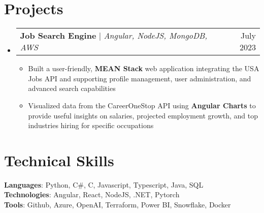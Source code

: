 \documentclass[letterpaper,11pt]{article}
\makeatletter
\newcommand{\resumeItem}[1]{
  \item\small{
    {#1 \vspace{-2pt}}
  }
}
\newcommand{\resumeSubSubheading}[2]{
    \item
    \begin{tabular*}{0.97\textwidth}{l@{\extracolsep{\fill}}r}
      \textit{\small#1} & \textit{\small #2} \\
    \end{tabular*}\vspace{-7pt}
}
\newcommand{\resumeProjectHeading}[2]{
    \item
    \begin{tabular*}{0.97\textwidth}{l@{\extracolsep{\fill}}r}
      \small#1 & #2 \\
    \end{tabular*}\vspace{-7pt}
}
\newcommand{\resumeSubHeadingListStart}{\begin{itemize}[leftmargin=0.15in, label={}]}
\newcommand{\resumeSubHeadingListEnd}{\end{itemize}}
\newcommand{\resumeItemListStart}{\begin{itemize}}
\newcommand{\resumeItemListEnd}{\end{itemize}\vspace{-5pt}}
\makeatother
\begin{document}

\section{Projects}
    \resumeSubHeadingListStart         
    
    \resumeProjectHeading
      {\textbf{Job Search Engine} $|$ \emph{Angular, NodeJS, MongoDB, AWS}}{July 2023}
      \resumeItemListStart
        \resumeItem{Built a user-friendly, \textbf{MEAN Stack} web application integrating the USA Jobs API and supporting profile management, user administration, and advanced search capabilities}
        \resumeItem{Visualized data from the CareerOneStop API using \textbf{Angular Charts} to provide useful insights on salaries, projected employment growth, and top industries hiring for specific occupations}
      \resumeItemListEnd
      \resumeSubHeadingListEnd

\section{Technical Skills}
  \begin{itemize}[leftmargin=0.15in, label={}]
    \small{\item{
    {\textbf{Languages}: Python, C\#, C, Javascript, Typescript, Java, SQL}\\
    {\textbf{Technologies}: Angular, React, NodeJS, .NET, Pytorch}\\
    {\textbf{Tools}: Github, Azure, OpenAI, Terraform, Power BI, Snowflake, Docker}}}
\end{itemize}
\end{document}
